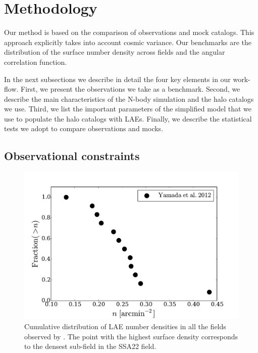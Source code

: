 \documentclass{emulateapj}
\begin{document}
\section{Methodology}

Our method is based on the comparison of observations and mock
catalogs. This approach explicitly takes into account cosmic
variance. Our benchmarks are the distribution of the surface number
density across fields and the angular correlation function.

In the next subsections we describe in detail the four key
elements in our work-flow. First, we present the 
observations we take as a benchmark. Second, we describe the main
characteristics of the N-body simulation and the halo catalogs we
use. Third, we list the important parameters of the simplified
model that we use to populate the halo catalogs with LAEs. Finally, we
describe the statistical tests we adopt to compare observations and mocks.

\subsection{Observational constraints}


\begin{figure}
\begin{center}
\includegraphics[width=0.95\linewidth,angle=0]{Fig1b.pdf}
\caption{ \label{fig:number_density} Cumulative distribution of LAE number
  densities in all the fields observed by \citet{Yamada2012}. The
  point with the highest surface density corresponds to the densest
  sub-field in the SSA22 field.}
\end{center} 
\end{figure}
\end{document}

